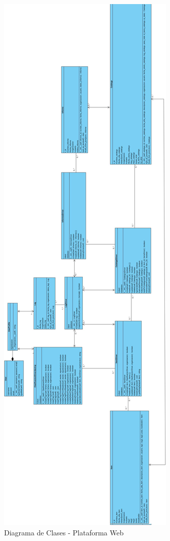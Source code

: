 \documentclass[a4paper,11pt]{book}
\begin{document}
\begin{figure}[H] 
\centering 
\includegraphics[scale=0.15]{imagenes/clases/NoInventory_clases_web.jpg}
\caption{ Diagrama de Clases - Plataforma Web\cite{propio}  }  
\end{figure}
\end{document}
